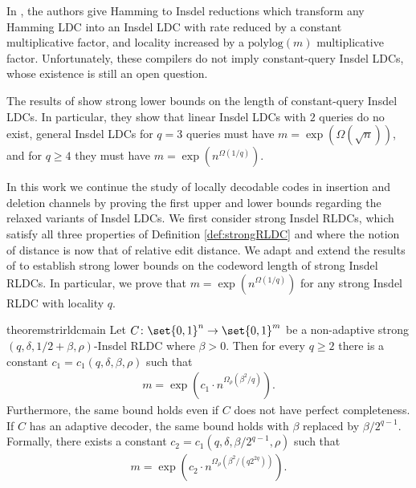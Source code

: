 \documentclass[10pt,a4paper]{article}
\theoremstyle{remark}
\newcommand{\polylog}{\ensuremath{\mathrm{polylog}}\xspace}
\newcommand{\tuple}[1]{\ensuremath{\left(#1\right)}}
\newcommand{\tp}{\tuple}
\newcommand{\authnote}[3]{\textcolor{#2}{{\sf (#1's Note: {\sl{#3}})}}}
\newcommand{\jeremiah}{\authnote{Jeremiah}{blue}}
\newcommand{\enote}{\authnote{Elena}{green}}
\newcommand{\authnote}{}
\newcommand{\jeremiah}[1]{}
\newcommand{\enote}[1]{}
\begin{document}
In \cite{Ostrovsky-InsdelLDC-Compiler,BlockBGKZ20}, the authors give Hamming to Insdel reductions which transform any Hamming LDC into an Insdel LDC with rate reduced by a constant multiplicative factor, and locality increased by a  $\polylog(m)$ multiplicative factor. Unfortunately, these compilers do not imply constant-query Insdel LDCs, whose existence is still an open question.


 The results of \cite{blocki2021exponential} show  strong lower bounds on the length of constant-query Insdel LDCs. In particular, they show that  linear Insdel LDCs with $2$  queries do no exist,  general Insdel LDCs for $q= 3$ queries must have  $m=\exp(\Omega(\sqrt{n}))$, and for $q\geq 4$ they must have $m=\exp(n^{\Omega(1/q)}).$ 
 
 
 In this work we continue the study of locally decodable codes in insertion and deletion channels by proving the first upper and lower bounds regarding the relaxed variants of Insdel LDCs. %
 We first consider strong Insdel RLDCs, which satisfy all three properties of Definition \ref{def:strongRLDC} and where the notion of distance is now that of relative edit distance. We adapt and extend the results of \cite{blocki2021exponential} to establish strong lower bounds on the codeword length of strong Insdel RLDCs. In particular, we prove that $m= \exp(n^{\Omega(1/q)})$ for any strong Insdel RLDC with locality $q$.
 
 

 \begin{restatable}{theorem}{strirldcmain} \label{thm:main-sinsdel RLDC}
	Let $C \colon \set{0,1}^n \rightarrow \set{0,1}^m$ be a non-adaptive strong $(q,\delta,1/2+\beta,\rho)$-Insdel RLDC where $\beta>0$. Then for every $q\ge 2$ there is a constant $c_1=c_1(q,\delta,\beta,\rho)$ such that  
	\begin{align*}
	    m = \exp\tp{c_1\cdot n^{\Omega_{\rho}(\beta^2/q)}}.
	\end{align*}
	Furthermore, the same bound holds even if $C$ does not have perfect completeness. If $C$ has an adaptive decoder, the same bound holds with $\beta$ replaced by $\beta/2^{q-1}$. Formally, there exists a constant $c_2=c_1(q,\delta,\beta/2^{q-1},\rho)$ such that
	\begin{align*}
	    m = \exp\tp{c_2\cdot n^{\Omega_{\rho}(\beta^2/(q2^{2q}))}}.
	\end{align*}
\end{restatable} 
\end{document}
